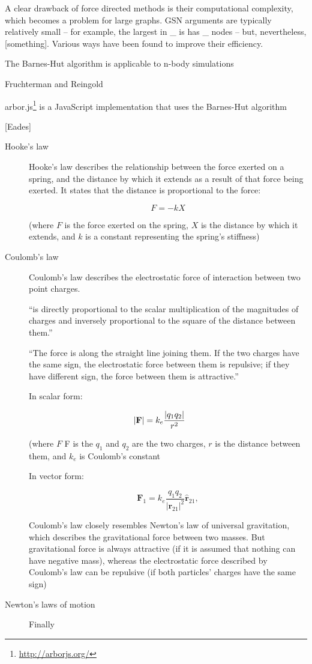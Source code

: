 A clear drawback of force directed methods is their computational complexity, which becomes a problem for large graphs.
GSN arguments are typically relatively small -- for example, the largest in \_ is has \_ nodes -- but, nevertheless, [something].
Various ways have been found to improve their efficiency.

The Barnes-Hut algorithm is applicable to n-body simulations \citet{quigleyfade} 

Fruchterman and Reingold 

arbor.js\footnote{\url{http://arborjs.org/}} is a JavaScript implementation that uses the Barnes-Hut algorithm 

[Eades]

\citet{handbook:forcedir}

\begin{description}

\item[Hooke's law] Hooke's law describes the relationship between the force exerted on a spring,
    and the distance by which it extends as a result of that force being exerted.
    It states that the distance is proportional to the force:

    $$
    F = -kX
    $$

    (where $F$ is the force exerted on the spring,
    $X$ is the distance by which it extends,
    and $k$ is a constant representing the spring's stiffness)

\item[Coulomb's law] Coulomb's law describes the electrostatic force of interaction between two point charges.

    ``is directly proportional to the scalar multiplication of the magnitudes of charges and inversely proportional to the square of the distance between them.''

    ``The force is along the straight line joining them.
    If the two charges have the same sign,
    the electrostatic force between them is repulsive;
    if they have different sign,
    the force between them is attractive.'' 

    In scalar form:

    $$
    |\mathbf F|=k_e{|q_1q_2|\over r^2}\qquad
    $$

    (where $F$ F is the $q_1$ and $q_2$ are the two charges, $r$ is the distance between them, and $k_e$ is Coulomb's constant 

    In vector form:

    $$
    \qquad\mathbf F_1=k_e\frac{q_1q_2}{{|\mathbf r_{21}|}^2} \mathbf{\hat{r}}_{21},\qquad
    $$

    Coulomb's law closely resembles Newton's law of universal gravitation, which describes the gravitational force between two masses.
    But gravitational force is always attractive (if it is assumed that nothing can have negative mass),
    whereas the electrostatic force described by Coulomb's law can be repulsive (if both particles' charges have the same sign)

\item[Newton's laws of motion] Finally

\end{description}


